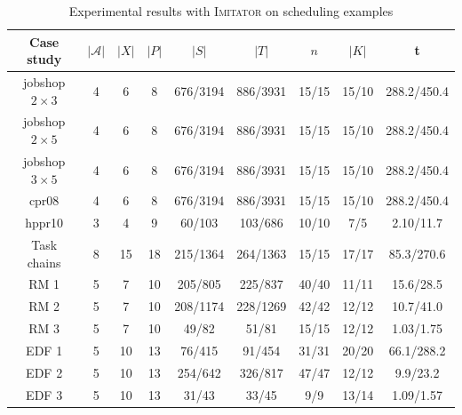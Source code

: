 \documentclass{llncs}
\newcommand{\imitator}{\textsc{Imitator}}
\begin{document}
\begin{table}[!ht]
 \centering
\begin{tabular}{|c|c|c|c|c|c|c|c|c|}
\hline
 Case study             & $|\mathcal{A}|$& $|X|$ & $|P|$ & $|S|$        & $|T|$         & $n$   &
$|K|$ & t               \\
\hline
jobshop $2\times 3$ \cite{AM02}               & 4 & 6         & 8     & 676/3194      & 886/3931      & 15/15 & 15/10
& 288.2/450.4   \\
\hline
jobshop $2\times 5$               & 4 & 6         & 8     & 676/3194      & 886/3931      & 15/15 & 15/10
& 288.2/450.4   \\
\hline
jobshop $3\times 5$               & 4 & 6         & 8     & 676/3194      & 886/3931      & 15/15 & 15/10
& 288.2/450.4   \\
\hline
cpr08 \cite{cpr08}               & 4 & 6         & 8     & 676/3194      & 886/3931      & 15/15 & 15/10
& 288.2/450.4   \\
\hline
hppr10 \cite{LPPRC10}             & 3 & 4 &  9& 60/103    & 103/686               & 10/10 & 7/5 &
2.10/11.7\\
\hline
Task chains \cite{SGL97} & 8 & 15 & 18 & 215/1364 & 264/1363 & 15/15 &
17/17 & 85.3/270.6\\
\hline
RM 1            & 5 & 7         & 10    & 205/805       & 225/837       & 40/40 & 11/11 & 15.6/28.5  \\
\hline
RM 2            & 5 & 7         & 10    & 208/1174      & 228/1269      & 42/42 & 12/12 & 10.7/41.0  \\
\hline
RM 3            & 5 & 7         & 10    & 49/82         & 51/81         & 15/15 & 12/12 & 1.03/1.75  \\
\hline
EDF 1           & 5 & 10        & 13    & 76/415        & 91/454 & 31/31        & 20/20 & 66.1/288.2  \\
\hline
EDF 2           & 5 & 10        & 13    & 254/642       & 326/817       & 47/47 & 12/12 & 9.9/23.2  \\
\hline
EDF 3           & 5 & 10&  13   & 31/43         & 33/45         & 9/9   & 13/14 & 1.09/1.57  \\
\hline
\end{tabular}
\caption{Experimental results with \imitator{} on scheduling examples}
 \label{table:results}
\end{table}
\end{document}
